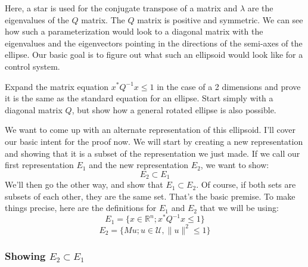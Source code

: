 Here, a star is used for the conjugate transpose of a matrix and  $\lambda$ are the eigenvalues of the $Q$ matrix. The $Q$ matrix is positive and symmetric. We can see how such a parameterization would look to a diagonal matrix with the eigenvalues and the eigenvectors pointing in the directions of the semi-axes of the ellipse. Our basic goal is to figure out what such an ellipsoid would look like for a control system.

\begin{exercise}
Expand the matrix equation $x^*Q^{-1}x\le1$ in the case of a 2 dimensions and prove it is the same as the standard equation for an ellipse. Start simply with a diagonal matrix $Q$, but show how a general rotated ellipse is also possible.
\end{exercise}

We want to come up with an alternate representation of this ellipsoid. I'll cover our basic intent for the proof now. We will start by creating a new representation and showing that it is a subset of the representation we just made. If we call our first representation $E_1$ and the new representation $E_2$, we want to show:
$$E_2\subset E_1$$
We'll then go the other way, and show that $E_1\subset E_2$. Of course, if both sets are subsets of each other, they are the same set. That's the basic premise. To make things precise, here are the definitions for $E_1$ and $E_2$ that we will be using:
$$E_1=\{x\in\mathbb{R}^n;x^*Q^{-1}x\le1\}$$
$$E_2=\{Mu;u\in\mathcal{U},\|u\|^2\le1\}$$

\subsubsection{Showing $E_2\subset E_1$}

